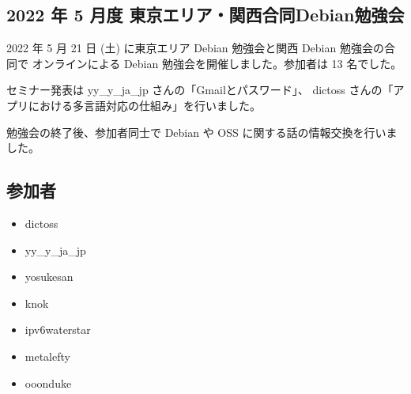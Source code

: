 \documentclass[mingoth,a4paper]{jsarticle}
\begin{document}

\subsection{2022 年 5 月度 東京エリア・関西合同Debian勉強会}

2022 年 5 月 21 日 (土) に東京エリア Debian 勉強会と関西 Debian 勉強会の合同で
オンラインによる Debian 勉強会を開催しました。参加者は 13 名でした。

セミナー発表は yy\_y\_ja\_jp さんの「Gmailとパスワード」、
dictoss さんの「アプリにおける多言語対応の仕組み」を行いました。

勉強会の終了後、参加者同士で Debian や OSS に関する話の情報交換を行いました。






%

%
%
%
%





\subsection{参加者}

\begin{itemize}
  \item dictoss
  \item yy\_y\_ja\_jp
  \item yosukesan
  \item knok
  \item ipv6waterstar
  \item metalefty
  \item ooonduke
\end{itemize}
\end{document}
